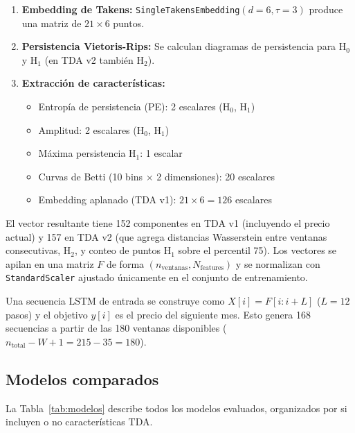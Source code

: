 \documentclass[12pt, a4paper]{article}
\begin{document}
\begin{enumerate}[leftmargin=1.5em]
  \item \textbf{Embedding de Takens:} \texttt{SingleTakensEmbedding}$(d=6, \tau=3)$ produce
        una matriz de $21 \times 6$ puntos.
  \item \textbf{Persistencia Vietoris-Rips:} Se calculan diagramas de persistencia para
        H$_0$ y H$_1$ (en TDA v2 también H$_2$).
  \item \textbf{Extracción de características:}
        \begin{itemize}
          \item Entropía de persistencia (PE): 2 escalares (H$_0$, H$_1$)
          \item Amplitud: 2 escalares (H$_0$, H$_1$)
          \item Máxima persistencia H$_1$: 1 escalar
          \item Curvas de Betti (10 bins $\times$ 2 dimensiones): 20 escalares
          \item Embedding aplanado (TDA v1): $21 \times 6 = 126$ escalares
        \end{itemize}
\end{enumerate}

El vector resultante tiene 152 componentes en TDA v1 (incluyendo el precio actual) y 157 en
TDA v2 (que agrega distancias Wasserstein entre ventanas consecutivas, H$_2$, y conteo de
puntos H$_1$ sobre el percentil 75). Los vectores se apilan en una matriz $F$ de forma
$(n_\mathrm{ventanas}, N_\mathrm{features})$ y se normalizan con \texttt{StandardScaler}
ajustado únicamente en el conjunto de entrenamiento.

Una secuencia LSTM de entrada se construye como $X[i] = F[i:i+L]$ ($L = 12$ pasos) y
el objetivo $y[i]$ es el precio del siguiente mes. Esto genera 168 secuencias a partir de
las 180 ventanas disponibles ($n_\mathrm{total} - W + 1 = 215 - 35 = 180$).

\subsection{Modelos comparados}

La Tabla~\ref{tab:modelos} describe todos los modelos evaluados, organizados por si incluyen o
no características TDA.
\end{document}
